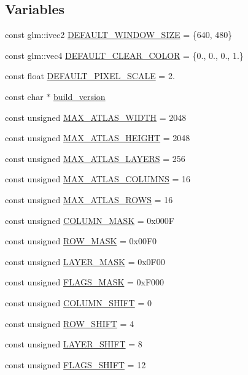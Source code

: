 \subsection*{Variables}
\begin{DoxyCompactItemize}
\item 
const glm\+::ivec2 \hyperlink{namespacepixel_a9c38287d50c84fb5c1f25c965db0a6a5}{D\+E\+F\+A\+U\+L\+T\+\_\+\+W\+I\+N\+D\+O\+W\+\_\+\+S\+I\+ZE} = \{640, 480\}
\item 
const glm\+::vec4 \hyperlink{namespacepixel_aa4c296a437eb1e0def40cff29b699be2}{D\+E\+F\+A\+U\+L\+T\+\_\+\+C\+L\+E\+A\+R\+\_\+\+C\+O\+L\+OR} = \{0., 0., 0., 1.\}
\item 
const float \hyperlink{namespacepixel_ae08ee7e855f850855389107cb37ae167}{D\+E\+F\+A\+U\+L\+T\+\_\+\+P\+I\+X\+E\+L\+\_\+\+S\+C\+A\+LE} = 2.
\item 
const char $\ast$ \hyperlink{namespacepixel_a6e11b54e14afd660e5a36b3abe987836}{build\+\_\+version}
\item 
const unsigned \hyperlink{namespacepixel_a6fb51ac03c694b483565e72325cf512c}{M\+A\+X\+\_\+\+A\+T\+L\+A\+S\+\_\+\+W\+I\+D\+TH} = 2048
\item 
const unsigned \hyperlink{namespacepixel_aefb604fb64e77dc547b535878be8a0e0}{M\+A\+X\+\_\+\+A\+T\+L\+A\+S\+\_\+\+H\+E\+I\+G\+HT} = 2048
\item 
const unsigned \hyperlink{namespacepixel_a639b50e285d9c01e854c0f43b3d46de7}{M\+A\+X\+\_\+\+A\+T\+L\+A\+S\+\_\+\+L\+A\+Y\+E\+RS} = 256
\item 
const unsigned \hyperlink{namespacepixel_af5cb5eaa9faae17a3cb216d7cd60ef99}{M\+A\+X\+\_\+\+A\+T\+L\+A\+S\+\_\+\+C\+O\+L\+U\+M\+NS} = 16
\item 
const unsigned \hyperlink{namespacepixel_a6e018b7c395b70f2d58cff5673fefbf2}{M\+A\+X\+\_\+\+A\+T\+L\+A\+S\+\_\+\+R\+O\+WS} = 16
\item 
const unsigned \hyperlink{namespacepixel_a167493024436b6379df2e623e901339a}{C\+O\+L\+U\+M\+N\+\_\+\+M\+A\+SK} = 0x000F
\item 
const unsigned \hyperlink{namespacepixel_aea89b4b69dfad5a5cf380d6968eaab50}{R\+O\+W\+\_\+\+M\+A\+SK} = 0x00\+F0
\item 
const unsigned \hyperlink{namespacepixel_a284c4f3a4e9456176ae8305684498943}{L\+A\+Y\+E\+R\+\_\+\+M\+A\+SK} = 0x0\+F00
\item 
const unsigned \hyperlink{namespacepixel_abb267adea85e005428256b927067e7a6}{F\+L\+A\+G\+S\+\_\+\+M\+A\+SK} = 0x\+F000
\item 
const unsigned \hyperlink{namespacepixel_afd432223a9000f01c11b849714a7dc7d}{C\+O\+L\+U\+M\+N\+\_\+\+S\+H\+I\+FT} = 0
\item 
const unsigned \hyperlink{namespacepixel_a0b6a80d3466444afcc23925231216d21}{R\+O\+W\+\_\+\+S\+H\+I\+FT} = 4
\item 
const unsigned \hyperlink{namespacepixel_a1ce4f3e5bcecc9774497381ae948c58e}{L\+A\+Y\+E\+R\+\_\+\+S\+H\+I\+FT} = 8
\item 
const unsigned \hyperlink{namespacepixel_a4720c8ed87add19bc1079e98087192fc}{F\+L\+A\+G\+S\+\_\+\+S\+H\+I\+FT} = 12
\end{DoxyCompactItemize}


